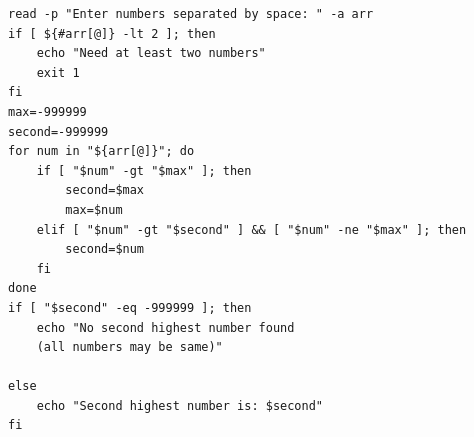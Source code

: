 \begin{verbatim}
read -p "Enter numbers separated by space: " -a arr
if [ ${#arr[@]} -lt 2 ]; then
    echo "Need at least two numbers"
    exit 1
fi
max=-999999
second=-999999
for num in "${arr[@]}"; do
    if [ "$num" -gt "$max" ]; then
        second=$max
        max=$num
    elif [ "$num" -gt "$second" ] && [ "$num" -ne "$max" ]; then
        second=$num
    fi
done
if [ "$second" -eq -999999 ]; then
    echo "No second highest number found 
    (all numbers may be same)"

else
    echo "Second highest number is: $second"
fi
\end{verbatim}